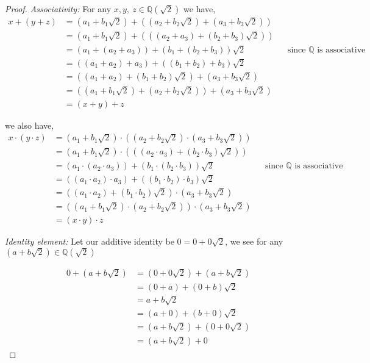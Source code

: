 \documentclass[12pt]{article}
\newcommand      {\Qm}         {{\mathbb Q}}
\begin{document}
\begin{itemize}
\begin{itemize}
\begin{proof}
        \textit{Associativity:} For any $x,y,\ z \in \Qm(\sqrt{2})$ we have,
        \begin{align*}
            x + (y + z) &= (a_1 + b_1\sqrt{2}) + ((a_2 + b_2\sqrt{2}) + (a_3 + b_3\sqrt{2})) \\
            &= (a_1 + b_1\sqrt{2}) + (((a_2 + a_3) + (b_2 + b_3)\sqrt{2})) \\
            &= (a_1 + (a_2 + a_3)) + (b_1 + (b_2 + b_3))\sqrt{2} && \text{since $\Qm$ is associative} \\
            &= ((a_1 + a_2) + a_3) + ((b_1 + b_2) + b_3)\sqrt{2} \\
            &= ((a_1 + a_2) + (b_1 + b_2)\sqrt{2}) +(a_3 + b_3\sqrt{2}) \\
            &= ((a_1 + b_1\sqrt{2}) + (a_2 + b_2\sqrt{2})) + (a_3 + b_3\sqrt{2}) \\
            &= (x+y) + z
        \end{align*}

        we also have,
        \begin{align*}
            x \cdot (y \cdot z) &= (a_1 + b_1\sqrt{2}) \cdot ((a_2 + b_2\sqrt{2}) \cdot (a_3 + b_3\sqrt{2})) \\
            &= (a_1 + b_1\sqrt{2}) \cdot (((a_2 \cdot a_3) + (b_2 \cdot b_3)\sqrt{2})) \\
            &= (a_1 \cdot (a_2 \cdot a_3)) + (b_1 \cdot (b_2 \cdot b_3))\sqrt{2} && \text{since $\Qm$ is associative} \\
            &= ((a_1 \cdot a_2) \cdot a_3) + ((b_1 \cdot b_2) \cdot b_3)\sqrt{2} \\
            &= ((a_1 \cdot a_2) + (b_1 \cdot b_2)\sqrt{2}) \cdot(a_3 + b_3\sqrt{2}) \\
            &= ((a_1 + b_1\sqrt{2}) \cdot (a_2 + b_2\sqrt{2})) \cdot (a_3 + b_3\sqrt{2}) \\
            &= (x\cdot y) \cdot z
        \end{align*}

        \textit{Identity element:} Let our additive identity be $0 = 0 + 0\sqrt{2}$, we see for any $(a+b\sqrt{2}) \in \Qm(\sqrt{2})$

        \begin{align*}
            0 + (a+b\sqrt{2}) &= (0+0\sqrt{2}) + (a+b\sqrt{2}) \\
            &= (0+a) + (0+b)\sqrt{2} \\
            &= a + b\sqrt{2} \\
            &= (a+ 0) + (b+0)\sqrt{2} \\
            &= (a+b\sqrt{2}) + (0+ 0\sqrt{2})\\
            &= (a+b\sqrt{2}) + 0
        \end{align*}


\end{proof}
\end{itemize}
\end{itemize}
\end{document}
